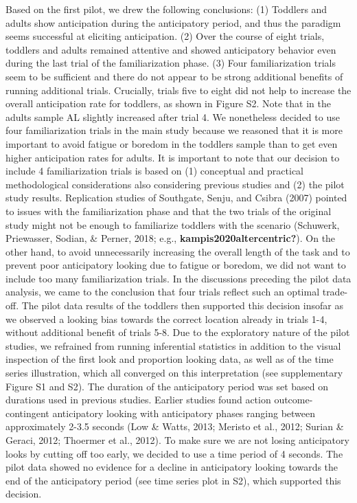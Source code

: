 \documentclass[
  man, donotrepeattitle,floatsintext]{apa6}
\begin{document}
Based on the first pilot, we drew the following conclusions: (1) Toddlers and adults show anticipation during the anticipatory period, and thus the paradigm seems successful at eliciting anticipation. (2) Over the course of eight trials, toddlers and adults remained attentive and showed anticipatory behavior even during the last trial of the familiarization phase. (3) Four familiarization trials seem to be sufficient and there do not appear to be strong additional benefits of running additional trials. Crucially, trials five to eight did not help to increase the overall anticipation rate for toddlers, as shown in Figure S2. Note that in the adults sample AL slightly increased after trial 4. We nonetheless decided to use four familiarization trials in the main study because we reasoned that it is more important to avoid fatigue or boredom in the toddlers sample than to get even higher anticipation rates for adults.
It is important to note that our decision to include 4 familiarization trials is based on (1) conceptual and practical methodological considerations also considering previous studies and (2) the pilot study results. Replication studies of Southgate, Senju, and Csibra (2007) pointed to issues with the familiarization phase and that the two trials of the original study might not be enough to familiarize toddlers with the scenario (Schuwerk, Priewasser, Sodian, \& Perner, 2018; e.g., \textbf{kampis2020altercentric?}). On the other hand, to avoid unnecessarily increasing the overall length of the task and to prevent poor anticipatory looking due to fatigue or boredom, we did not want to include too many familiarization trials. In the discussions preceding the pilot data analysis, we came to the conclusion that four trials reflect such an optimal trade-off. The pilot data results of the toddlers then supported this decision insofar as we observed a looking bias towards the correct location already in trials 1-4, without additional benefit of trials 5-8. Due to the exploratory nature of the pilot studies, we refrained from running inferential statistics in addition to the visual inspection of the first look and proportion looking data, as well as of the time series illustration, which all converged on this interpretation (see supplementary Figure S1 and S2).
The duration of the anticipatory period was set based on durations used in previous studies. Earlier studies found action outcome-contingent anticipatory looking with anticipatory phases ranging between approximately 2-3.5 seconds (Low \& Watts, 2013; Meristo et al., 2012; Surian \& Geraci, 2012; Thoermer et al., 2012). To make sure we are not losing anticipatory looks by cutting off too early, we decided to use a time period of 4 seconds. The pilot data showed no evidence for a decline in anticipatory looking towards the end of the anticipatory period (see time series plot in S2), which supported this decision.
\end{document}
